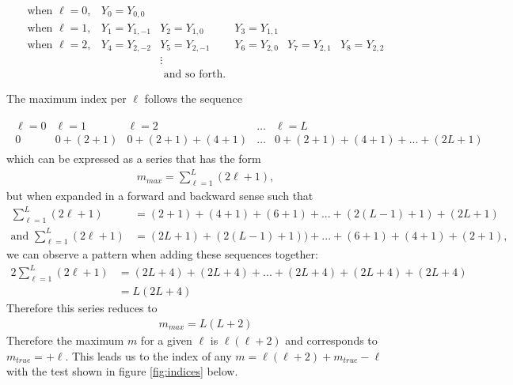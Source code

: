 \documentclass[11pt,letterpaper,titlepage]{article}
\numberwithin{equation}{section}
\begin{document}
\begin{equation*}
\begin{matrix}
\text{when }\ell=0,  &Y_0 = Y_{0,0} \\
\text{when }\ell=1,  &Y_1 = Y_{1,-1} &Y_2 = Y_{1,0} &Y_3 = Y_{1,1} \\
\text{when }\ell=2,  &Y_4 = Y_{2,-2} &Y_5 = Y_{2,-1} &Y_6 = Y_{2,0} &Y_7 = Y_{2,1} & Y_8 = Y_{2,2}\\
        &               &\vdots \\
        &               &\text{ and so forth}.
\end{matrix}
\end{equation*}

\noindent The maximum index per $\ell$ follows the sequence

\begin{align}
\begin{matrix}
\ell=0       &\ell=1      &\ell=2                      &\hdots     &\ell=L \\
0            &0+(2+1) & 0+(2 +1)+(4+1)     &\hdots     &0+(2 +1)+(4+1) +...+(2L+1)
\end{matrix}
\end{align}
\newline
\noindent which can be expressed as a series that has the form 
\begin{align}
m_{max}=\sum_{\ell=1}^L (2\ell+1),
\end{align}
but when expanded in a forward and backward sense such that 
\begin{align*}
\sum_{\ell=1}^L (2\ell+1)  &= (2+1)+(4+1)+(6+1)+...+(2(L-1)+1)+(2L+1) \\
\text{and   }
\sum_{\ell=1}^L (2\ell+1)  &= (2L+1)+(2(L-1)+1))+...+(6+1)+(4+1)+(2+1), 
\end{align*}
\noindent we can observe a pattern when adding these sequences together:
\begin{align*}
2\sum_{\ell=1}^L (2\ell+1) &= (2L+4)+(2L+4)+...+(2L+4)+(2L+4)+(2L+4) \\
&= L(2L+4) 
\end{align*}
\noindent
Therefore this series reduces to
\begin{align}
m_{max} = L(L+2)
\end{align}
\newline
\noindent Therefore the maximum $m$ for a given $\ell$ is $\ell(\ell+2)$ and corresponds to $m_{true}=+\ell$. This leads us to the index of any $m=\ell(\ell+2)+m_{true}-\ell$ with the test shown in figure \ref{fig:indices} below.
\end{document}
